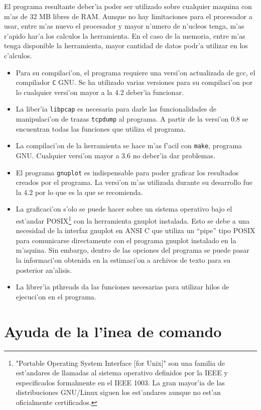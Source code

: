 El programa resultante deber'ia poder ser utilizado sobre cualquier maquina 
con m'as de 32 MB libres de RAM. Aunque no hay limitaciones para el procesador
a usar, entre m'as nuevo el procesador y mayor n'umero de n'ucleos tenga, m'as
r'apido har'a los calculos la herramienta. En el caso de la memoria, entre 
m'as tenga disponible la herramienta, mayor cantidad de datos podr'a utilizar 
en los c'alculos.

\begin{itemize}
\item Para su compilaci'on, el programa requiere una versi'on actualizada de
gcc, el compilador {\tt C} GNU. Se ha utilizado varias versiones para su
compilaci'on por lo cualquier versi'on mayor a la $4.2$ deber'ia funcionar.
\item La liber'ia {\tt libpcap} es necesaria para darle las funcionalidades de
manipulaci'on de trazas {\tt tcpdump} al programa. A partir de la versi'on
$0.8$ se encuentran todas las funciones que utiliza el programa.
\item La compilaci'on de la herramienta se hace m'as f'acil con {\tt make},
programa GNU. Cualquier versi'on mayor a $3.6$ no deber'ia dar problemas.
\item El programa {\tt gnuplot} es indispensable para poder graficar los
resultados creados por el programa. La versi'on m'as utilizada durante su
desarrollo fue la $4.2$ por lo que es la que se recomienda.
\item La graficaci'on s'olo se puede hacer sobre un sistema operativo bajo el
est'andar POSIX\footnote{"Portable Operating System Interface [for Unix]" son
una familia de est'andares de llamadas al sistema operativo definidos por la
IEEE y especificados formalmente en el IEEE 1003. La gran mayor'ia de las
distribuciones GNU/Linux siguen los est'andares aunque no est'an
oficialmente certificados.} con la herramienta gnuplot instalada. Esto se debe
a una necesidad de la interfaz gnuplot en ANSI C que utiliza un ``pipe'' tipo
POSIX para comunicarse directamente con el programa gnuplot instalado en la
m'aquina. Sin embargo, dentro de las opciones del programa se puede pasar la
informaci'on obtenida en la estimaci'on a archivos de texto para su posterior
an'alisis.
\item La librer'ia pthreads da las funciones necesarias para utilizar hilos
de ejecuci'on en el programa.
\end{itemize}

\section{Ayuda de la l'inea de comando} \label{sect:ayuda}

